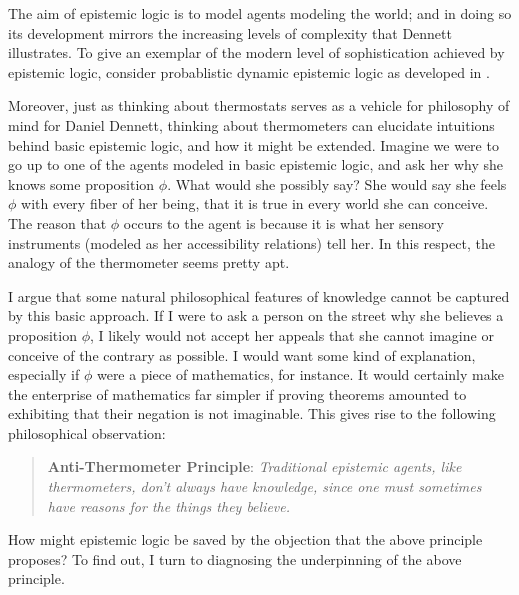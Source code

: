 \documentclass[11pt]{article}
\numberwithin{equation}{subsection}
\begin{document}
The aim of epistemic logic is to model agents modeling the world; and
in doing so its development mirrors the increasing levels of
complexity that Dennett illustrates.  To give an exemplar of the
modern level of sophistication achieved by epistemic logic, consider
probablistic dynamic epistemic logic as developed in \citep{van_benthem_dynamic_2009}.

Moreover, just as thinking about thermostats serves as a vehicle for
philosophy of mind for Daniel Dennett, thinking about
thermometers can elucidate intuitions behind basic epistemic logic,
and how it might be extended.
Imagine we were to go up to one of the agents modeled in basic
epistemic logic, and ask her why she knows some
proposition $\phi$. What would she possibly say?  She would say she feels
$\phi$ with every fiber of her being, that it is true in every
world she can conceive.  The reason that $\phi$ occurs to
the agent is because it is what her sensory instruments (modeled as her
accessibility relations) tell her.   In this respect, the analogy of
the thermometer seems pretty apt.

I argue that some natural philosophical features of knowledge 
cannot be captured by this basic approach.
If I were to ask a person on the street why she believes a proposition $\phi$, I
likely would not accept her appeals that she cannot imagine or
conceive of the contrary as possible.  I would want some kind of
explanation, especially if $\phi$ were a piece of mathematics, for
instance.  It would certainly make the enterprise of mathematics far
simpler if proving theorems amounted to exhibiting that their negation
is not imaginable. This gives rise to the following philosophical observation:
\begin{quote}
\textbf{Anti-Thermometer Principle}: \emph{Traditional epistemic agents,
  like thermometers, don't always have knowledge, since one must
  sometimes have reasons for the things they believe.}
\end{quote}

How might epistemic logic be saved by the objection that the above
principle proposes?  To find out, I turn to diagnosing the
underpinning of the above principle.
\end{document}
